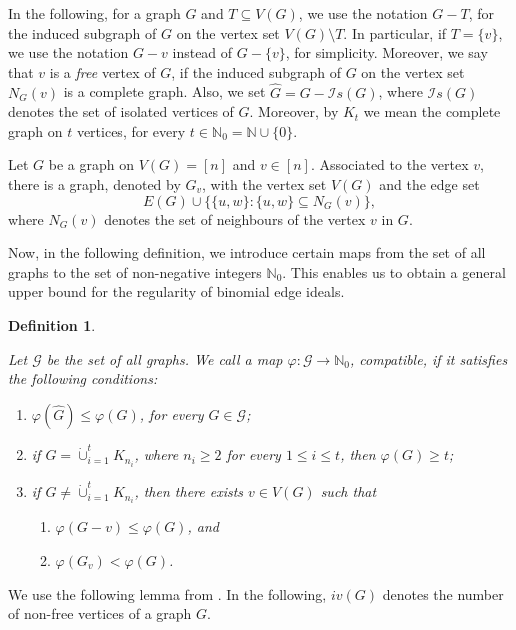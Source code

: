 \documentclass[12pt]{amsart}
\def\NZQ{\mathbb}               %
\def\NN{{\NZQ N}}
\newtheorem{Definition}[Theorem]{Definition}
\begin{document}
\par \medskip In the following, for a graph $G$ and $T\subseteq V(G)$, we use the notation $G-T$, for the induced subgraph of $G$ on the vertex set $V(G)\setminus T$. In particular, if $T=\{v\}$, we use the notation $G-v$ instead of $G-\{v\}$, for simplicity. Moreover, we say that $v$ is a   \emph{free} vertex of $G$, if the induced subgraph of $G$ on the vertex set $N_G(v)$ is a complete graph. Also, we set $\widehat{G}=G-\mathcal{I}s(G)$, where $\mathcal{I}s(G)$ denotes the set of isolated vertices of $G$. Moreover, by $K_t$ we mean the complete graph on $t$ vertices, for every $t\in \NN_0=\NN\cup\{0\}$. 
\par Let $G$ be a graph on $V(G)=[n]$ and $v\in [n]$. Associated to the vertex $v$, there is a graph, denoted by $G_{v}$, with the vertex set $V(G)$ and the edge set 
\[
E(G)\cup \{\{u,w\}: \{u,w\}\subseteq N_{G}(v)\},
\]
where $N_{G}(v)$ denotes the set of neighbours of the vertex $v$ in $G$.
\par Now, in the following definition, we introduce certain maps from the set of all graphs to the set of non-negative integers $\NN_0$. This enables us to obtain a general upper bound for the regularity of binomial edge ideals. 
\begin{Definition}\label{varphi}
\em{
Let $\mathcal{G}$ be the set of all graphs. We call a map $\varphi:\mathcal{G}\longrightarrow \NN_0$, \emph{compatible}, if it satisfies the following conditions:
\begin{enumerate}
\item[{(a)}] $\varphi(\widehat{G})\leq \varphi(G)$, for every $G\in \mathcal{G}$;
\item[{(b)}] if $G=\dot{\cup}_{i=1}^{t}K_{n_i}$, where $n_i\geq 2$ for every $1\leq i\leq t$, then $\varphi(G)\geq t$;
\item[{(c)}] if $G\neq \dot{\cup}_{i=1}^{t}K_{n_i}$, then there exists $v\in V(G)$ such that
\begin{enumerate}
\item[{(1)}] $\varphi(G-v)\leq \varphi(G)$, and
\item[{(2)}] $\varphi(G_v)<\varphi(G)$.
\end{enumerate}
\end{enumerate}
}
\end{Definition}


\par We use the following lemma from \cite{Kumar}. In the following, $iv(G)$ denotes the number of non-free vertices of a graph $G$.
  
\end{document}
